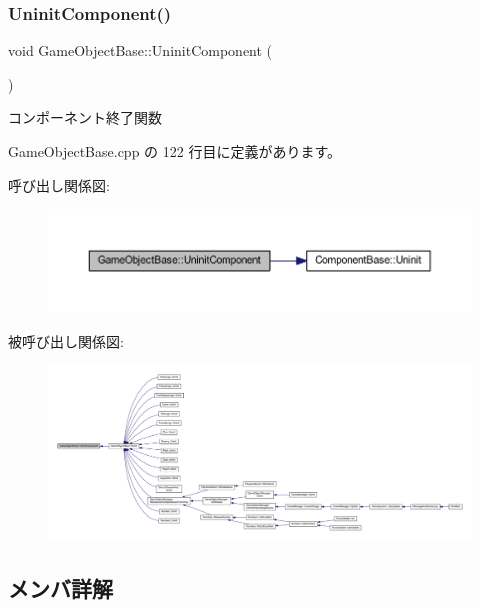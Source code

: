 \subsubsection{\texorpdfstring{Uninit\+Component()}{UninitComponent()}}
{\footnotesize\ttfamily void Game\+Object\+Base\+::\+Uninit\+Component (\begin{DoxyParamCaption}{ }\end{DoxyParamCaption})\hspace{0.3cm}{\ttfamily [private]}}



コンポーネント終了関数 



 Game\+Object\+Base.\+cpp の 122 行目に定義があります。

呼び出し関係図\+:\nopagebreak
\begin{figure}[H]
\begin{center}
\leavevmode
\includegraphics[width=350pt]{class_game_object_base_aff8e4f486435f5d921c186b0824e8a0e_cgraph}
\end{center}
\end{figure}
被呼び出し関係図\+:
\nopagebreak
\begin{figure}[H]
\begin{center}
\leavevmode
\includegraphics[width=350pt]{class_game_object_base_aff8e4f486435f5d921c186b0824e8a0e_icgraph}
\end{center}
\end{figure}


\subsection{メンバ詳解}
\mbox{\label{class_game_object_base_a63c44924e1e0c90461d191fdb11f33b0}} 
